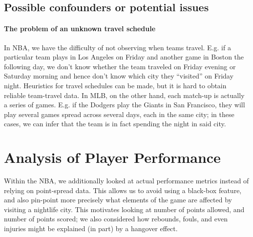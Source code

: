 \documentclass[letterpaper,12pt]{article}
\begin{document}
\subsection{Possible confounders or potential issues}

\paragraph{The problem of an unknown travel schedule} In NBA, we have the difficulty of not observing when teams travel. E.g. if a particular team  plays
in Los Angeles on Friday and another game in Boston the following day, we don't
know whether the team traveled on Friday evening or Saturday morning and hence don't know
which city they ``visited'' on Friday night. Heuristics for
travel schedules can be made, but it is hard to obtain reliable team-travel data.
In MLB, on the other hand, each match-up is actually a series of games. E.g.
if the Dodgers play the Giants in San Francisco, they will play several games spread
across several days, each in the same city; in these cases, we can infer that the team
is in fact spending the night in said city.


\section{Analysis of Player Performance}
Within the NBA, we additionally looked at actual performance metrics instead of relying on point-spread data. 
This allows us to avoid using a black-box feature, and also pin-point
more precisely what elements of the game are affected by visiting a nightlife city. This motivates looking at number of points allowed, and number of points scored; we also considered how rebounds, fouls, and even injuries might be 
explained (in part) by a hangover effect.

\end{document}
